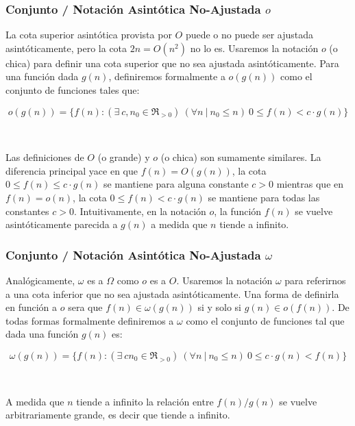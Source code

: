 \subsubsection{Conjunto / Notaci\'on Asint\'otica No-Ajustada $o$}

La cota superior asint\'otica provista por $O$ puede o no puede ser ajustada asint\'oticamente, pero la cota $2n = O(n^2)$ no lo es. Usaremos la notaci\'on $o$ (o chica) para definir una cota superior que no sea ajustada asint\'oticamente. Para una funci\'on dada $g(n)$, definiremos formalmente a $o(g(n))$ como el conjunto de funciones tales que:

\begin{equation*}
 o(g(n)) = \{ f(n) : (\exists\ c, n_0 \in \Re_{>0}) \ (\forall n\ |\ n_0 \leq n)\ 0 \leq f(n) < c \cdot g(n) \}
\end{equation*}

~

Las definiciones de $O$ (o grande) y $o$ (o chica) son sumamente similares. La diferencia principal yace en que $f(n) = O(g(n))$, la cota $0 \leq f(n) \leq c \cdot g(n)$ se mantiene para alguna constante $c > 0$ mientras que en $f(n) = o(n)$, la cota $0 \leq f(n) < c \cdot g(n)$ se mantiene para todas las constantes $c > 0$. Intuitivamente, en la notaci\'on $o$, la funci\'on $f(n)$ se vuelve asint\'oticamente parecida a $g(n)$ a medida que $n$ tiende a infinito.

\subsubsection{Conjunto / Notaci\'on Asint\'otica No-Ajustada $\omega$}

Anal\'ogicamente, $\omega$ es a $\Omega$ como $o$ es a $O$. Usaremos la notaci\'on $\omega$ para referirnos a una cota inferior que no sea ajustada asint\'oticamente. Una forma de definirla en funci\'on a $o$ sera que $f(n) \in \omega(g(n))$ si y solo si $g(n) \in o(f(n))$. De todas formas formalmente definiremos a $\omega$ como el conjunto de funciones tal que dada una funci\'on $g(n)$ es:

\begin{equation*}
 \omega(g(n)) = \{ f(n) : (\exists\ c n_0 \in \Re_{>0}) \ (\forall n\ |\ n_0 \leq n)\ 0 \leq c \cdot g(n) < f(n) \}
\end{equation*}

~

A medida que $n$ tiende a infinito la relaci\'on entre $f(n)/g(n)$ se vuelve arbitrariamente grande, es decir que tiende a infinito.

